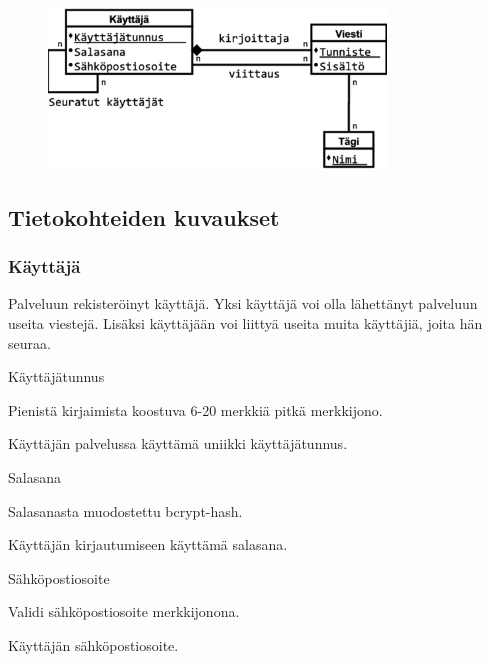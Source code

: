 \documentclass{article}
\begin{document}
\begin{figure}[H]
    \centering
    \includegraphics[width=0.8\textwidth]{tietosisalto.pdf}
\end{figure}

\subsection{Tietokohteiden kuvaukset}

\subsubsection{Käyttäjä}

Palveluun rekisteröinyt käyttäjä. Yksi käyttäjä voi olla lähettänyt palveluun useita viestejä. Lisäksi käyttäjään voi liittyä useita muita käyttäjiä, joita hän seuraa.

\begin{description}[itemsep=0pt]
    \item[Attribuutti] Käyttäjätunnus
    \item[Arvojoukko] Pienistä kirjaimista koostuva 6-20 merkkiä pitkä merkkijono.
    \item[Kuvailu] Käyttäjän palvelussa käyttämä uniikki käyttäjätunnus.
\end{description}

\begin{description}[itemsep=0pt]
    \item[Attribuutti] Salasana
    \item[Arvojoukko] Salasanasta muodostettu bcrypt-hash.
    \item[Kuvailu] Käyttäjän kirjautumiseen käyttämä salasana.
\end{description}

\begin{description}[itemsep=0pt]
    \item[Attribuutti] Sähköpostiosoite
    \item[Arvojoukko] Validi sähköpostiosoite merkkijonona.
    \item[Kuvailu] Käyttäjän sähköpostiosoite.
\end{description}
\end{document}
